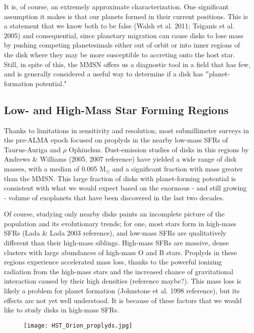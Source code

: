 It is, of course, an extremely approximate characterization. One significant assumption it makes is that our planets formed in their current positions. This is a statement that we know both to be false (Walsh et al. 2011; Tsiganis et al. 2005) and consequential, since planetary migration can cause disks to lose mass by pushing competing planetesimals either out of orbit or into inner regions of the disk where they may be more susceptible to accreting onto the host star. Still, in spite of this, the MMSN offers us a diagnostic tool in a field that has few, and is generally considered a useful way to determine if a disk has $''$planet-formation potential."


\subsection{Low- and High-Mass Star Forming Regions}
Thanks to limitations in sensitivity and resolution, most submillimeter surveys in the pre-ALMA epoch focused on proplyds in the nearby low-mass SFRs of Taurus-Auriga and $\rho$ Ophiuchus. Dust-emission studies of disks in this regions by Andrews \& Williams (2005, 2007 reference) have yielded a wide range of disk masses, with a median of 0.005 M$_{\odot}$ and a significant fraction with mass greater than the MMSN. This large fraction of disks with planet-forming potential is consistent with what we would expect based on the enormous - and still growing - volume of exoplanets that have been discovered in the last two decades.

Of course, studying only nearby disks paints an incomplete picture of the population and its evolutionary trends; for one, most stars form in high-mass SFRs (Lada \& Lada 2003 reference), and low-mass SFRs are qualitatively different than their high-mass siblings. High-mass SFRs are massive, dense clusters with large abundances of high-mass O and B stars. Proplyds in these regions experience accelerated mass loss, thanks to the powerful ionizing radiation from the high-mass stars and the increased chance of gravitational interaction caused by their high densities (reference maybe?). This mass loss is likely a problem for planet formation (Johnstone et al. 1998 reference), but its effects are not yet well understood. It is because of these factors that we would like to study disks in high-mass SFRs.


\begin{figure}[t!]
\centering
  \texttt{[image: HST\_Orion\_proplyds.jpg]}
  \label{fig:HST_ONC}
\end{figure}

